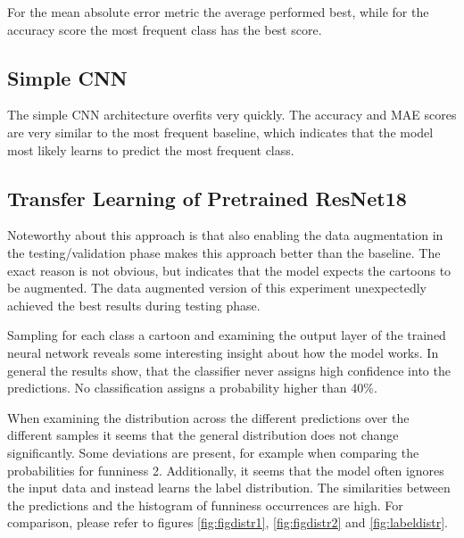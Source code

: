 \documentclass[draft,final,oneside]{vutinfth} %
\begin{document}
For the mean absolute error metric the average performed best, while for the accuracy score the most frequent class has the best score.

\subsection{Simple CNN}
The simple CNN architecture overfits very quickly. The accuracy and MAE scores are very similar to the most frequent baseline, which indicates that the model most likely learns to predict the most frequent class.

\subsection{Transfer Learning of Pretrained ResNet18}
Noteworthy about this approach is that also enabling the data augmentation in the testing/validation phase makes this approach better than the baseline. The exact reason is not obvious, but indicates that the model expects the cartoons to be augmented. The data augmented version of this experiment unexpectedly achieved the best results during testing phase.

Sampling for each class a cartoon and examining the output layer of the trained neural network reveals some interesting insight about how the model works. In general the results show, that the classifier never assigns high confidence into the predictions. No classification assigns a probability higher than 40\%.

When examining the distribution across the different predictions over the different samples it seems that the general distribution does not change significantly. Some deviations are present, for example when comparing the probabilities for funniness 2. Additionally, it seems that the model often ignores the input data and instead learns the label distribution. The similarities between the predictions and the histogram of funniness occurrences are high. For comparison, please refer to figures \ref{fig:figdistr1}, \ref{fig:figdistr2} and \ref{fig:labeldistr}.
\end{document}
